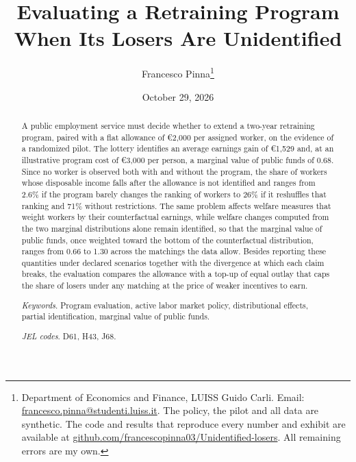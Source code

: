 \documentclass[11pt,a4paper]{article}
\title{Evaluating a Retraining Program\\When Its Losers Are Unidentified}
\author{Francesco Pinna\thanks{Department of Economics and Finance, LUISS Guido Carli. Email: \href{mailto:francesco.pinna@studenti.luiss.it}{francesco.pinna@studenti.luiss.it}. The policy, the pilot and all data are synthetic. The code and results that reproduce every number and exhibit are available at \href{https://github.com/francescopinna03/Unidentified-losers}{github.com/francescopinna03/Unidentified-losers}. All remaining errors are my own.}}
\date{October 29, 2026}
\begin{document}
\maketitle
\vspace{-1.2em}
\begin{abstract}
\noindent A public employment service must decide whether to extend a two-year retraining program, paired with a flat allowance of €2,000 per assigned worker, on the evidence of a randomized pilot. The lottery identifies an average earnings gain of €1,529 and, at an illustrative program cost of €3,000 per person, a marginal value of public funds of 0.68. Since no worker is observed both with and without the program, the share of workers whose disposable income falls after the allowance is not identified and ranges from 2.6\% if the program barely changes the ranking of workers to 26\% if it reshuffles that ranking and 71\% without restrictions. The same problem affects welfare measures that weight workers by their counterfactual earnings, while welfare changes computed from the two marginal distributions alone remain identified, so that the marginal value of public funds, once weighted toward the bottom of the counterfactual distribution, ranges from 0.66 to 1.30 across the matchings the data allow. Besides reporting these quantities under declared scenarios together with the divergence at which each claim breaks, the evaluation compares the allowance with a top-up of equal outlay that caps the share of losers under any matching at the price of weaker incentives to earn.\par
\vspace{4pt}\noindent\textit{Keywords}. Program evaluation, active labor market policy, distributional effects, partial identification, marginal value of public funds.\par
\noindent\textit{JEL codes}. D61, H43, J68.
\end{abstract}
\end{document}
